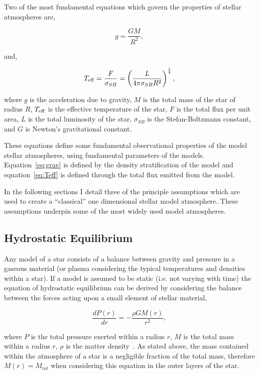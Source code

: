 Two of the most fundamental equations which govern the properties of stellar atmospheres are,

\begin{equation}
    g = \frac{GM}{R^2},\label{eq:grav}
\end{equation}

\noindent and,

\begin{equation}
    T_{\rm eff} = \frac{F}{\sigma_{SB}} = \left(\frac{L}{4\pi \sigma_{SB}R^2}\right)^\frac{1}{4},\label{eq:Teff}
\end{equation}

\noindent where $g$ is the acceleration due to gravity, $M$ is the total mass of the star of radius $R$, $T_{\rm eff}$ is the effective temperature of the star, $F$ is the total flux per unit area, $L$ is the total luminosity of the star, $\sigma_{SB}$ is the Stefan-Boltzmann constant,  and $G$ is Newton's gravitational constant.

These equations define some fundamental observational properties of the model stellar atmospheres, using fundamental parameters of the models.
Equation~\ref{eq:grav} is defined by the density stratification of the model and equation~\ref{eq:Teff} is defined through the total flux emitted from the model.

In the following sections I detail three of the principle assumptions which are used to create a ``classical'' one dimensional stellar model atmosphere.
These assumptions underpin some of the most widely used model atmospheres.


\subsection{Hydrostatic Equilibrium} %
\label{sub:hydrostatic_equilibrium}

Any model of a star consists of a balance between gravity and pressure in a gaseous material (or plasma considering the typical temperatures and densities within a star).
If a model is assumed to be static (i.e. not varying with time) the equation of hydrostatic equilibrium can be derived by considering the balance between the forces acting upon a small element of stellar material,

\begin{equation}
    \frac{dP(r)}{dr} = -\frac{\rho GM(r)}{r^2},\label{eq:hydro}
\end{equation}

\noindent where $P$ is the total pressure exerted within a radius $r$, $M$ is the total mass within a radius $r$, $\rho$ is the matter density~\citep[see Chapter 9 of ][for a simple derivation of this equation]{1989isa2.book.....B}.
As stated above, the mass contained within the atmosphere of a star is a negligible fraction of the total mass, therefore $M(r) = M_{tot}$ when considering this equation in the outer layers of the star.

